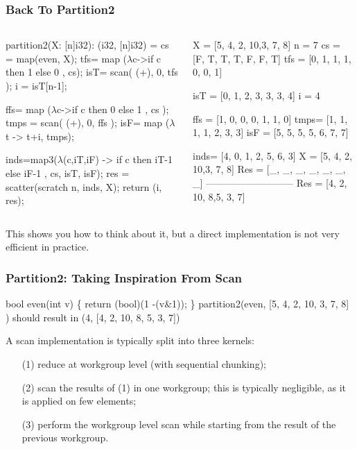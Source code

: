 \documentclass{beamer}
\newcommand{\emp}[1]{\textcolor{DikuRed}{ #1}}
\newcommand{\mymath}[1]{$ #1 $}
\begin{document}
\begin{frame}[fragile,t]
  \frametitle{Back To Partition2}

\begin{columns}
\begin{colorcode}
partition2(X: [n]i32): (i32, [n]i32) =
 cs = map(even, X);
 tfs= map (\mymath{\lambda}c->if c then 1 else 0
          ,  cs);
 isT= scan( (+), 0, tfs );
 i  = isT[n-1];

 ffs= map (\mymath{\lambda}c->if c then 0 else 1
          ,  cs );
 tmps = scan( (+), 0, ffs );
 isF= map (\mymath{\lambda}t -> t+i, tmps);

 inds=map3(\mymath{\lambda}(c,iT,iF) -> 
              if c then iT-1 else iF-1
          , cs, isT, isF);
 res = scatter(scratch n, inds, X);
 return (i, res);
\end{colorcode}
\vspace{-2ex}
\begin{colorcode}[fontsize=\scriptsize]
\emp{X   = [5, 4, 2, 10,3, 7, 8]}
\emp{n   = 7}
\emp{cs  = [F, T, T, T, F, F, T]}
\emp{tfs = [0, 1, 1, 1, 0, 0, 1]}

\emp{isT = [0, 1, 2, 3, 3, 3, 4]}
\emp{i   = 4}

\emp{ffs = [1, 0, 0, 0, 1, 1, 0]}
\emp{tmps= [1, 1, 1, 1, 2, 3, 3]}
\emp{isF = [5, 5, 5, 5, 6, 7, 7]}

\emp{inds= [4, 0, 1, 2, 5, 6, 3]}
\emp{X   = [5, 4, 2, 10,3, 7, 8]}
\emp{Res = [_, _, _, _, _, _, _]}
\emp{---------------------------}
\emp{Res = [4, 2, 10, 8,5, 3, 7]} 
\end{colorcode}
\end{columns}
\bigskip

This shows you how to think about it, but a direct 
implementation is not very efficient in practice.

\end{frame}

\begin{frame}[fragile,t]
  \frametitle{Partition2: Taking Inspiration From Scan}

\begin{colorcode}
bool even(int v) \{ return (bool)(1 -(v&1)); \}
partition2(even, [5, 4, 2, 10, 3, 7, 8] ) should result in
             (4, [4, 2, 10, 8, 5, 3, 7])
\end{colorcode}

A scan implementation is typically split into three kernels:\medskip
\begin{itemize}
    \item[(1)] reduce at workgroup level (with sequential chunking);\medskip
    \item[(2)] scan the results of (1) in one workgroup; this is typically
                negligible, as it is applied on few elements;\medskip
    \item[(3)] perform the workgroup level scan while starting from the
                result of the previous workgroup.
\end{itemize}
\end{frame}
\end{document}

